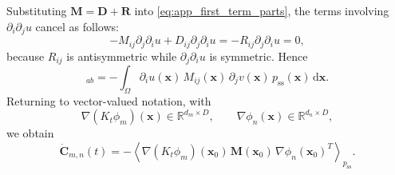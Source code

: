 \documentclass[11pt,twoside,fleqn]{article}
\renewcommand{\d}{\mathrm{d}}
\begin{document}
Substituting $\bm{M}=\bm{D}+\bm{R}$ into \eqref{eq:app_first_term_parts}, the terms involving $\partial_i\partial_j u$ cancel as follows:
\begin{equation}
    -
    M_{ij}\partial_j\partial_i u
    +
    D_{ij}\partial_j\partial_i u
    =
    -
    R_{ij}\partial_j\partial_i u
    =
    0,
    \label{eq:app_antisymmetric_hessian_cancellation}
\end{equation}
because $R_{ij}$ is antisymmetric while $\partial_j\partial_i u$ is symmetric. Hence
\begin{equation}
    [\dot{\bm{C}}_{m,n}(t)]_{ab}
    =
    -
    \int_\Omega
        \partial_i u(\bm{x})\,
        M_{ij}(\bm{x})\,
        \partial_j v(\bm{x})\,
        p_{\mathrm{ss}}(\bm{x})\,
        \d\bm{x}.
    \label{eq:app_C_entry_gradient_form}
\end{equation}
Returning to vector-valued notation, with
\[
    \nabla(K_t\phi_m)(\bm{x})\in\mathbb{R}^{d_m\times D},
    \qquad
    \nabla\phi_n(\bm{x})\in\mathbb{R}^{d_n\times D},
\]
we obtain
\begin{equation}
    \dot{\bm{C}}_{m,n}(t)
    =
    -
    \left\langle
        \nabla(K_t\phi_m)(\bm{x}_0)\,
        \bm{M}(\bm{x}_0)\,
        \nabla\phi_n(\bm{x}_0)^T
    \right\rangle_{p_{\mathrm{ss}}}.
    \label{eq:app_Cdot_gradient_Koopman_form}
\end{equation}
\end{document}
